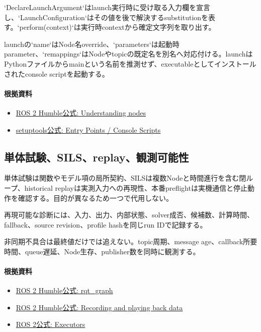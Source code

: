 \documentclass[a4paper,11pt]{article}
\begin{document}
`DeclareLaunchArgument`はlaunch実行時に受け取る入力欄を宣言し、`LaunchConfiguration`はその値を後で解決するsubstitutionを表す。`perform(context)`は実行時contextから確定文字列を取り出す。


launchの`name`はNode名override、`parameters`は起動時parameter、`remappings`はNodeやtopicの既定名を別名へ対応付ける。launchはPythonファイルからmainという名前を推測せず、executableとしてインストールされたconsole scriptを起動する。

\paragraph{根拠資料}
\begin{itemize}[leftmargin=1.6em]
\item \href{https://docs.ros.org/en/humble/Tutorials/Beginner-CLI-Tools/Understanding-ROS2-Nodes/Understanding-ROS2-Nodes.html}{ROS 2 Humble公式: Understanding nodes}
\item \href{https://setuptools.pypa.io/en/latest/userguide/entry_point.html}{setuptools公式: Entry Points / Console Scripts}
\end{itemize}

\subsection{単体試験、SILS、replay、観測可能性}
単体試験は関数やモデル項の局所契約、SILSは複数Nodeと時間進行を含む閉ループ、historical replayは実測入力への再現性、本番preflightは実機通信と停止動作を確認する。目的が異なるため一つで代用しない。


再現可能な診断には、入力、出力、内部状態、solver成否、候補数、計算時間、fallback、source revision、profile hashを同じrun IDで記録する。


非同期不具合は最終値だけでは追えない。topic周期、message age、callback所要時間、queue遅延、Node生存、publisher数を同時に観測する。

\paragraph{根拠資料}
\begin{itemize}[leftmargin=1.6em]
\item \href{https://docs.ros.org/en/ros2_packages/humble/api/rqt_graph/index.html}{ROS 2 Humble公式: rqt\_graph}
\item \href{https://docs.ros.org/en/humble/Tutorials/Beginner-CLI-Tools/Recording-And-Playing-Back-Data/Recording-And-Playing-Back-Data.html}{ROS 2 Humble公式: Recording and playing back data}
\item \href{https://docs.ros.org/en/rolling/Concepts/Intermediate/About-Executors.html}{ROS 2公式: Executors}
\end{itemize}
\end{document}
